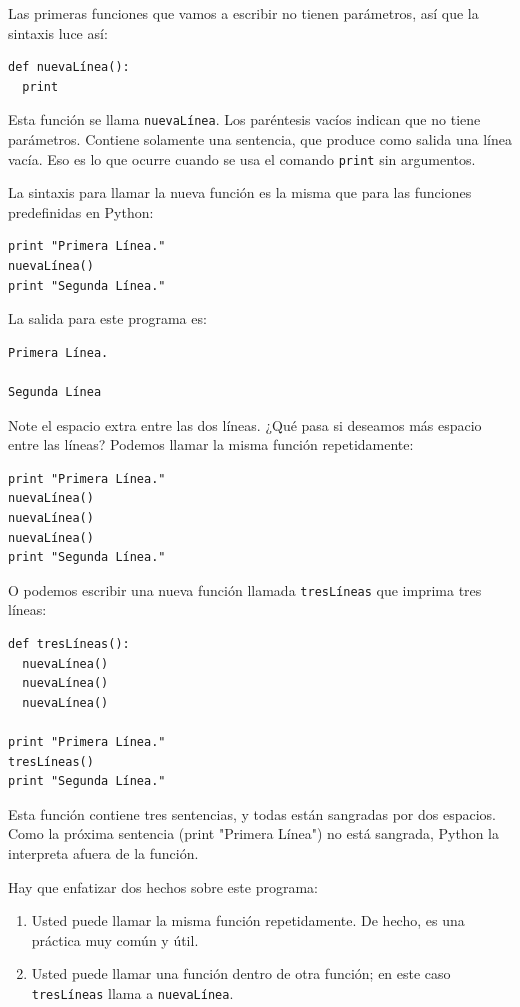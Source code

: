 Las primeras funciones que vamos a escribir no tienen parámetros, así que la
sintaxis luce así:

\beforeverb
\begin{verbatim}
def nuevaLínea():
  print
\end{verbatim}
\afterverb
%
Esta función se llama \texttt{nuevaLínea}.  Los paréntesis vacíos indican que no 
tiene parámetros. Contiene solamente una sentencia, que produce como salida
una línea vacía. Eso es lo que ocurre cuando se usa el comando \texttt{print}
sin argumentos.

La sintaxis para llamar la nueva función es la misma que para las funciones
predefinidas en Python:

\beforeverb
\begin{verbatim}
print "Primera Línea."
nuevaLínea()
print "Segunda Línea."
\end{verbatim}
\afterverb
%
La salida para este programa es:

\beforeverb
\begin{verbatim}
Primera Línea.

Segunda Línea
\end{verbatim}
\afterverb
%
Note el espacio extra entre las dos líneas. ¿Qué pasa si deseamos 
más espacio entre las líneas? Podemos llamar la misma función 
repetidamente:

\beforeverb
\begin{verbatim}
print "Primera Línea."
nuevaLínea()
nuevaLínea()
nuevaLínea()
print "Segunda Línea."
\end{verbatim}
\afterverb
%
O podemos escribir una nueva función llamada \texttt{tresLíneas} que imprima
tres líneas:

\beforeverb
\begin{verbatim}
def tresLíneas():
  nuevaLínea()
  nuevaLínea()
  nuevaLínea()

print "Primera Línea."
tresLíneas()
print "Segunda Línea."
\end{verbatim}
\afterverb
%
Esta función contiene tres sentencias, y todas están sangradas por dos espacios.
Como la próxima sentencia (print "Primera Línea") no está sangrada, Python la
interpreta afuera de la función.

Hay que enfatizar dos hechos sobre este programa:

\begin{enumerate}

\item Usted puede llamar la misma función repetidamente.  De hecho, es una práctica
muy común y útil.

\item Usted puede llamar una función dentro de otra función; en este caso
\texttt{tresLíneas} llama a \texttt{nuevaLínea}.

\end{enumerate}

